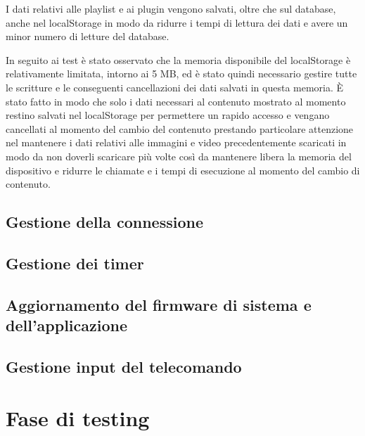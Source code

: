 I dati relativi alle playlist e ai plugin vengono salvati, oltre che sul database, anche nel localStorage in modo da ridurre i tempi di lettura dei dati e avere un minor numero di letture del database. 

In seguito ai test è stato osservato che la memoria disponibile del localStorage è relativamente limitata, intorno ai 5 MB, ed è stato quindi necessario gestire tutte le scritture e le conseguenti cancellazioni dei dati salvati in questa memoria. È stato fatto in modo che solo i dati necessari al contenuto mostrato al momento restino salvati nel localStorage per permettere un rapido accesso e vengano cancellati al momento del cambio del contenuto prestando particolare attenzione nel mantenere i dati relativi alle immagini e video precedentemente scaricati in modo da non doverli scaricare più volte così da mantenere libera la memoria del dispositivo e ridurre le chiamate e i tempi di esecuzione al momento del cambio di contenuto. 

\subsection{Gestione della connessione}
\subsection{Gestione dei timer}
\subsection{Aggiornamento del firmware di sistema e dell'applicazione}\label{update}
\subsection{Gestione input del telecomando}

\section{Fase di testing}


